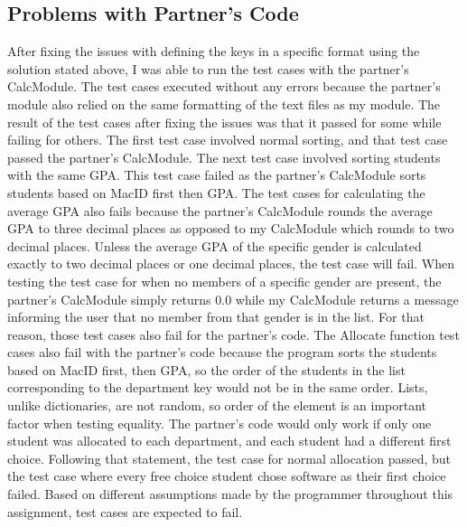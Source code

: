 \documentclass[12pt]{article}
\begin{document}
\subsection{Problems with Partner's Code}
After fixing the issues with defining the keys in a specific format using the solution stated above, I was able to run the test cases with the 
partner's CalcModule. The test cases executed without any errors because the partner's module also relied on the same formatting of the 
text files as my module. The result of the test cases after fixing the issues was that it passed for some while failing for others. 
The first test case involved normal sorting, and that test case passed the partner's CalcModule. The next test case involved sorting students 
with the same GPA. This test case failed as the partner's CalcModule sorts students based on MacID first then GPA. The test cases for calculating the 
average GPA also fails because the partner's CalcModule rounds the average GPA to three decimal places as opposed to my CalcModule which rounds to two 
decimal places. Unless the average GPA of the specific gender is calculated exactly to two decimal places or one decimal places, the test case will 
fail. When testing the test case for when no members of a specific gender are present, the partner's CalcModule simply returns 0.0 while my CalcModule 
returns a message informing the user that no member from that gender is in the list. For that reason, those test cases also fail for the partner's code. 
The Allocate function test cases also fail with the partner's code because the program sorts the students based on MacID first, then GPA, so the 
order of the students in the list corresponding to the department key would not be in the same order. Lists, unlike dictionaries, are not random, so order 
of the element is an important factor when testing equality. The partner's code would only work if only one student was allocated to each department, 
and each student had a different first choice. Following that statement, the test case for normal allocation passed, but the test case where every free 
choice student chose software as their first choice failed. Based on different assumptions made by the programmer throughout this assignment, test 
cases are expected to fail.
\end{document}
